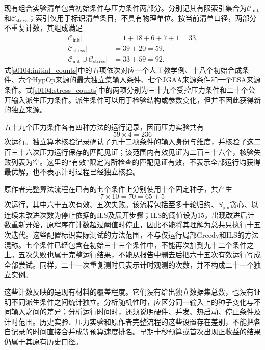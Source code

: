 现有组合实验清单包含初始条件与压力条件两部分。分别记其有限索引集合为$\mathcal C_{\mathrm{init}}$和$\mathcal C_{\mathrm{stress}}$；索引仅用于标识清单条目，不具有物理单位。按当前清单口径，两部分不重复计数，其组成满足
\begin{subequations}
 \label{s0104:condition_counts}
 \begin{align}
 |\mathcal C_{\mathrm{init}}|
 &=1+18+6+7+1=33,
 \label{s0104:initial_counts}\\
 |\mathcal C_{\mathrm{stress}}|
 &=39+20=59,
 \label{s0104:stress_counts}\\
 |\mathcal C_{\mathrm{init}}\cup\mathcal C_{\mathrm{stress}}|
 &=33+59=92.
 \label{s0104:total_counts}
 \end{align}
\end{subequations}
式\eqref{s0104:initial_counts}中的五项依次对应一个人工教学例、十八个初始合成条件、六个HypOp来源的最大独立集输入条件、七个JGAA来源条件和一个ESA来源条件。式\eqref{s0104:stress_counts}中的两项分别为三十九个受控压力条件和二十个公开输入派生压力条件。派生条件可以用于检验结构或参数变化，但并不因此获得新的独立来源。

五十九个压力条件各有四种方法的运行记录，因而压力实验共有
\begin{equation}
 59\times4=236
 \label{s0104:stress_runs}
\end{equation}
次运行。独立算术核验记录确认了九十二项条件的输入身份与维度，并核验了这二百三十六次压力运行保存的匹配见证；该范围内有效见证为二百三十六个，核验失败列表为空。这里的“有效”限定为所检查的匹配见证有效，不表示全部运行均获得最优解，也不表示计时过程已经独立核验。

原作者完整算法流程在已有的七个条件上分别使用十个固定种子，共产生
\begin{equation}
 7\times10=70=65+5
 \label{s0104:author_runs}
\end{equation}
次运行，其中六十五次有效、五次失败。该流程包括至多十轮归约、$S_{\mathrm{pin}}$贪心、以连续未改进次数为停止依据的ILS及展开步骤；ILS的阈值设为$15$，出现改进后计数重新开始，原程序在计数超过阈值时停止，因此不能将其理解为总共只执行十五次迭代。这些配置标识实际测试的方法范围，不与仅运行局部Greedy和ILS的方法混称。七个条件已经包含在初始三十三个条件中，不能再次加到九十二个条件之上。五次失败也属于完整运行结果，不能从报告中删去后把六十五次有效运行写成全部尝试。同样，二十一次重复测时只表示计时观测的次数，并不构成二十一个独立实例。

这些计数反映的是现有材料的覆盖程度。它们没有给出独立数据集总数，也没有证明不同派生条件之间统计独立。分析随机性时，应区分同一输入上的种子变化与不同输入之间的差异；分析运行时间时，还须说明硬件、并发、热启动、停止条件及计时范围。历史实验、压力实验和原作者完整流程的这些设置存在差别，不能把各自记录的时间直接合并成等预算速度排名。早期十秒预算或首次出现正收益的结果仍属于其原有历史口径。

